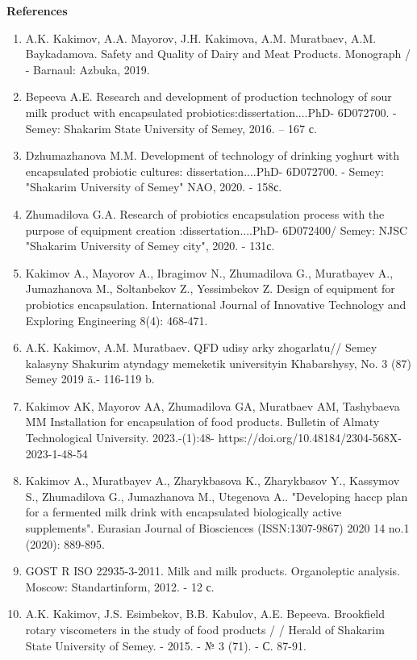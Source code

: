 \begin{center}
{\bfseries References}
\end{center}

\begin{enumerate}
\item
A.K. Kakimov, A.A. Mayorov, J.H. Kakimova, A.M. Muratbaev, A.M. Baykadamova. Safety and Quality of Dairy and Meat Products. Monograph / - Barnaul: Azbuka, 2019.

\item
Bepeeva A.E. Research and development of production technology of sour milk product with encapsulated probiotics:dissertation....PhD- 6D072700. - Semey: Shakarim State University of Semey, 2016. – 167 с.

\item
Dzhumazhanova M.M. Development of technology of drinking yoghurt with encapsulated probiotic cultures: dissertation....PhD- 6D072700. - Semey: "Shakarim University of Semey" NAO, 2020. - 158с.

\item
Zhumadilova G.A. Research of probiotics encapsulation process with the purpose of equipment creation :dissertation....PhD- 6D072400/ Semey: NJSC "Shakarim University of Semey city", 2020. - 131с.

\item
Kakimov A., Mayorov A., Ibragimov N., Zhumadilova G., Muratbayev A., Jumazhanova M., Soltanbekov Z., Yessimbekov Z. Design of equipment for probiotics encapsulation. International Journal of Innovative Technology and Exploring Engineering 8(4): 468-471.

\item
A.K. Kakimov, A.M. Muratbaev. QFD udisy arky zhogarlatu// Semey kalasyny Shakurim atyndagy memeketik universityin Khabarshysy, No. 3 (87) Semey 2019 ã.- 116-119 b.

\item
Kakimov AK, Mayorov AA, Zhumadilova GA, Muratbaev AM, Tashybaeva MM Installation for encapsulation of food products. Bulletin of Almaty Technological University. 2023.-(1):48- https://doi.org/10.48184/2304-568X-2023-1-48-54

\item
Kakimov A., Muratbayev A., Zharykbasova K., Zharykbasov Y., Kassymov S., Zhumadilova G., Jumazhanova M., Utegenova A.. "Developing haccp plan for a fermented milk drink with encapsulated biologically active supplements". Eurasian Journal of Biosciences (ISSN:1307-9867) 2020 14 no.1 (2020): 889-895.

\item
GOST R ISO 22935-3-2011. Milk and milk products. Organoleptic analysis. Moscow: Standartinform, 2012. - 12 с.

\item
A.K. Kakimov, J.S. Esimbekov, B.B. Kabulov, A.E. Bepeeva. Brookfield rotary viscometers in the study of food products / / Herald of Shakarim State University of Semey. - 2015. - № 3 (71). - С. 87-91.
\end{enumerate}

